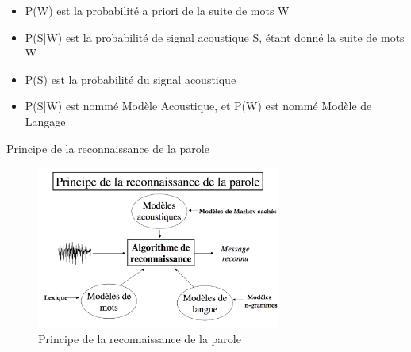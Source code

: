 \begin{frame}{}

\begin{itemize}
\item P(W) est la probabilité a priori de la suite de mots W
\item P(S|W) est la probabilité de signal acoustique S, étant donné la suite de mots W
\item P(S) est la probabilité du signal acoustique
\item P(S|W) est nommé Modèle Acoustique, et P(W) est nommé Modèle de Langage 
\end{itemize}
\end{frame}

\begin{frame}{Principe de la reconnaissance de la parole}

\begin{figure}
\centering
\includegraphics[width=8cm]{images/principe.png}
\caption{Principe de la reconnaissance de la parole}
\end{figure}
\end{frame}
